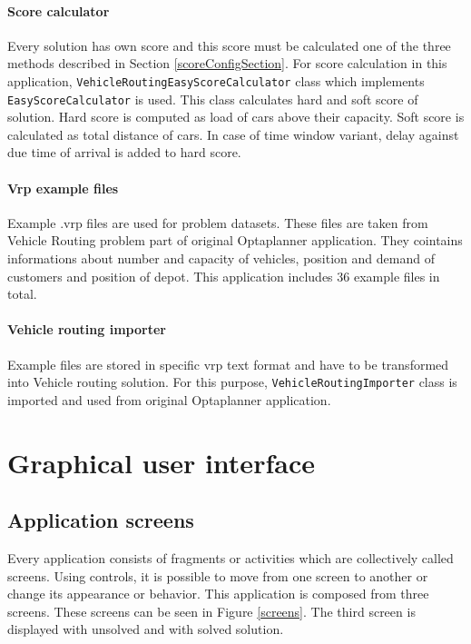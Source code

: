 \paragraph{Score calculator}
Every solution has own score and this score must be calculated one of the three methods described in Section
\ref{scoreConfigSection}. For score calculation in this application, \texttt{VehicleRoutingEasyScoreCalculator} class
which implements \texttt{EasyScoreCalculator} is used. This class calculates hard and soft score of solution. Hard score
is computed as load of cars above their capacity. Soft score is calculated as total distance of cars. In case of time
window variant, delay against due time of arrival is added to hard score.

\paragraph{Vrp example files}
Example .vrp files are used for problem datasets. These files are taken from Vehicle Routing problem part of original
Optaplanner application. They cointains informations about number and capacity of vehicles, position and demand of
customers and position of depot. This application includes 36 example files in total.

\paragraph{Vehicle routing importer}
Example files are stored in specific vrp text format and have to be transformed into Vehicle routing solution. For this
purpose, \texttt{VehicleRoutingImporter} class is imported and used from original Optaplanner application.

\section{Graphical user interface}\label{guiSection}

\subsection{Application screens}
Every application consists of fragments or activities which are collectively called screens. Using controls, it is
possible to move from one screen to another or change its appearance or behavior. This application is composed from
three screens. These screens can be seen in Figure \ref{screens}. The third screen is displayed with unsolved and with
solved solution.

